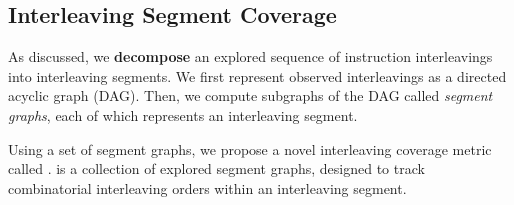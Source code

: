 % 



\subsection{Interleaving Segment Coverage}
\label{ss:coverage}

As discussed, we \textbf{decompose} an explored sequence 
of instruction interleavings into interleaving segments.
%
We first represent observed interleavings as a directed acyclic graph
(DAG). Then, we compute subgraphs of the DAG called \textit{segment graphs}, each of which represents an interleaving segment.



Using a set of segment graphs, we propose a novel interleaving
coverage metric called \textit{\intcov}.
%
\Intcov is a collection of explored segment graphs, designed to track
combinatorial interleaving orders within an interleaving segment.




